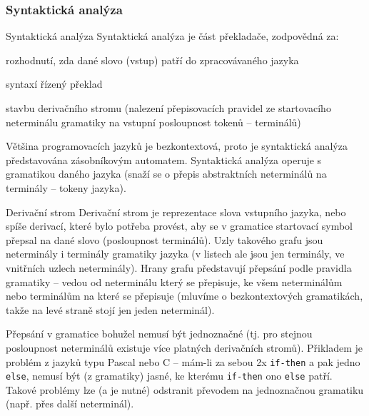 \subsubsection*{Syntaktická analýza}

\begin{definiceN}{Syntaktická analýza}
Syntaktická analýza je část překladače, zodpovědná za:
\begin{penumerate}
    \item rozhodnutí, zda dané slovo (vstup) patří do zpracovávaného jazyka
    \item syntaxí řízený překlad
    \item stavbu derivačního stromu (nalezení přepisovacích pravidel ze startovacího neterminálu gramatiky na vstupní posloupnost tokenů -- terminálů)
\end{penumerate}

Většina programovacích jazyků je bezkontextová, proto je syntaktická analýza představována zásobníkovým automatem. Syntaktická analýza operuje s gramatikou daného jazyka (snaží se o přepis abstraktních neterminálů na terminály -- tokeny jazyka).
\end{definiceN}

\begin{definiceN}{Derivační strom}
Derivační strom je  reprezentace slova vstupního jazyka, nebo spíše derivací, které bylo potřeba provést, aby se v gramatice startovací symbol přepsal na dané slovo (posloupnost terminálů). Uzly takového grafu jsou neterminály i terminály gramatiky jazyka (v listech ale jsou jen terminály, ve vnitřních uzlech neterminály). Hrany grafu představují přepsání podle pravidla gramatiky -- vedou od neterminálu který se přepisuje, ke všem neterminálům nebo terminálům na které se přepisuje (mluvíme o bezkontextových gramatikách, takže na levé straně stojí jen jeden neterminál).

Přepsání v gramatice bohužel nemusí být jednoznačné (tj. pro stejnou posloupnost neterminálů existuje více platných derivačních stromů). Přikladem je problém  z jazyků typu Pascal nebo C -- mám-li za sebou 2x \texttt{if-then} a pak jedno \texttt{else}, nemusí být (z gramatiky) jasné, ke kterému \texttt{if-then} ono \texttt{else} patří. Takové problémy lze (a je nutné) odstranit převodem na jednoznačnou gramatiku (např. přes další neterminál).
\end{definiceN}

